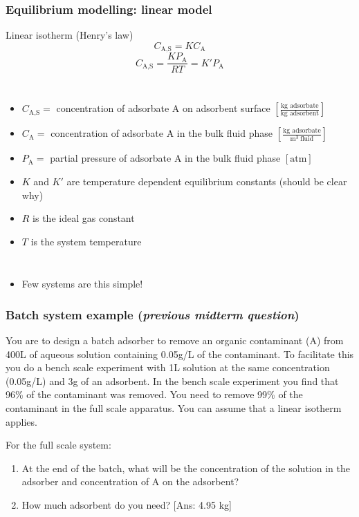 \begin{frame}\frametitle{Equilibrium modelling: linear model}
	\begin{exampleblock}{Linear isotherm (Henry's law)}
		\[C_\text{A,S} = K C_\text{A}\]
		\[C_\text{A,S} = \frac{K P_\text{A}}{RT} = K' P_\text{A}\]
	\end{exampleblock}
	\begin{columns}[t]
			\begin{itemize}
				\item	{\small $C_\text{A,S} =$ concentration of adsorbate A on adsorbent surface \hfill $\left[\displaystyle \frac{\text{kg adsorbate}}{\text{kg adsorbent}}\right]$}
				\item	{\small $C_\text{A} =$ concentration of adsorbate A in the bulk fluid phase \hfill $\left[\displaystyle \frac{\text{kg adsorbate}}{\text{m}^3~ \text{fluid}}\right]$}
				\item	{\small $P_\text{A} =$ partial pressure of adsorbate A in the bulk fluid phase \hfill $\left[ \text{atm}\right]\,$}
				\item	{\small $K$ and $K'$ are temperature dependent equilibrium constants {\tiny (should be clear why)}}
				\item	{\small $R$ is the ideal gas constant}
				\item	{\small $T$ is the system temperature}
			\end{itemize}
	\end{columns}
	\vspace{12pt}
	\begin{itemize}
		\item	Few systems are this simple!
	\end{itemize}
\end{frame}

\begin{frame}\frametitle{Batch system example (\emph{previous midterm question})}
	You are to design a batch adsorber to remove an organic contaminant (A) from 400L of aqueous solution containing 0.05g/L of the contaminant. To facilitate this you do a bench scale experiment with 1L solution at the same concentration (0.05g/L) and 3g of an adsorbent. In the bench scale experiment you find that 96\% of the contaminant was removed. You need to remove 99\% of the contaminant in the full scale apparatus. You can assume that a linear isotherm applies.

	\vspace{12pt}

	For the full scale system:

	\begin{enumerate}
		\item	At the end of the batch, what will be the concentration of the solution in the adsorber and concentration of A on the adsorbent?
		\item	How much adsorbent do you need? {\color{myOrange}[Ans: 4.95 kg]}

	\end{enumerate}
\end{frame}

